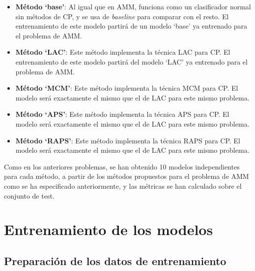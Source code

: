 \begin{itemize}

\item \textbf{Método `base'}: Al igual que en AMM, funciona como un clasificador normal sin métodos de CP, y
se usa de \textit{baseline} para comparar con el resto.
El entrenamiento de este modelo partirá de un modelo `base' ya entrenado para el problema de AMM.

\item \textbf{Método `LAC'}: Este método implementa la técnica LAC para CP. 
El entrenamiento de este modelo partirá del modelo `LAC' ya entrenado para el problema de AMM.

\item \textbf{Método `MCM'}: Este método implementa la técnica MCM para CP. 
El modelo será exactamente el mismo que el de LAC para este mismo problema. 

\item \textbf{Método `APS'}: Este método implementa la técnica APS para CP. 
El modelo será exactamente el mismo que el de LAC para este mismo problema.

\item \textbf{Método `RAPS'}: Este método implementa la técnica RAPS para CP. 
El modelo será exactamente el mismo que el de LAC para este mismo problema. 

\end{itemize} 

Como en los anteriores problemas, se han obtenido 10 modelos independientes para cada método, a partir de los 
métodos propuestos para el problema de AMM como se ha especificado anteriormente, y las métricas se han 
calculado sobre el conjunto de test.


\section{Entrenamiento de los modelos}

\subsection{Preparación de los datos de entrenamiento}

